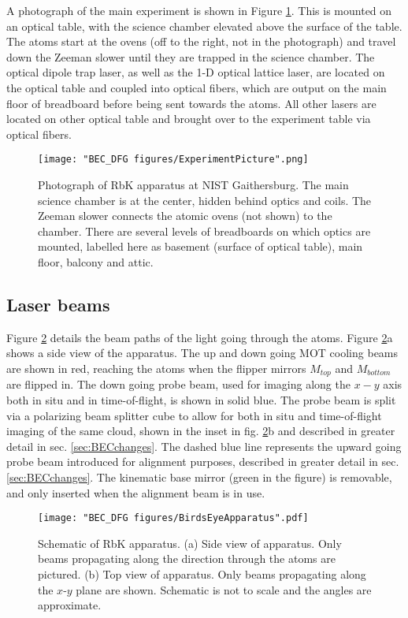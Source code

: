 A photograph of the main experiment is shown in Figure \ref{fig:ExperimentPicture}. This is mounted on an optical table, with the science chamber elevated above the surface of the table. The atoms start at the ovens (off to the right, not in the photograph) and travel down the Zeeman slower until they are trapped in the science chamber. The optical dipole trap laser, as well as the 1-D optical lattice laser, are located on the optical table and coupled into optical fibers, which are output on the main floor of breadboard before being sent towards the atoms. All other lasers are located on other optical table and brought over to the experiment table via optical fibers. 

\begin{figure}
	\texttt{[image: "BEC\_DFG figures/ExperimentPicture".png]}
\caption[Photograph of RbK apparatus at NIST Gaithersburg]{Photograph of RbK apparatus at NIST Gaithersburg. The main science chamber is at the center, hidden behind optics and coils. The Zeeman slower connects the atomic ovens (not shown) to the chamber. There are several levels of breadboards on which optics are mounted, labelled here as basement (surface of optical table), main floor, balcony and attic.}
\label{fig:ExperimentPicture}
\end{figure}

\subsection{Laser beams}\label{sec:laserBeams}
Figure \ref{fig:BirdsEyeApparatus} details the beam paths of the light going through the atoms. Figure \ref{fig:BirdsEyeApparatus}a shows a side view of the apparatus. The up and down going MOT cooling beams are shown in red, reaching the atoms when the flipper mirrors $M_{top}$ and $M_{bottom}$ are flipped in. The down going probe beam, used for imaging along the $x-y$ axis both in situ and in time-of-flight, is shown in solid blue. The probe beam is split via a polarizing beam splitter cube to allow for both in situ and time-of-flight imaging of the same cloud, shown in the inset in fig.  \ref{fig:BirdsEyeApparatus}b and described in greater detail in sec. \ref{sec:BECchanges}.  The dashed blue line represents the upward going probe beam introduced for alignment purposes, described in greater detail in sec. \ref{sec:BECchanges}. The kinematic base mirror (green in the figure) is removable, and only inserted when the alignment beam is in use. 

\begin{figure}
	\texttt{[image: "BEC\_DFG figures/BirdsEyeApparatus".pdf]}
\caption[Schematic of RbK apparatus]{Schematic of RbK apparatus. (a) Side view of apparatus. Only beams propagating along the \ez{} direction through the atoms are pictured. (b) Top view of apparatus. Only beams propagating along the $x$-$y$ plane are shown. Schematic is not to scale and the angles are approximate.}
\label{fig:BirdsEyeApparatus}
\end{figure}

